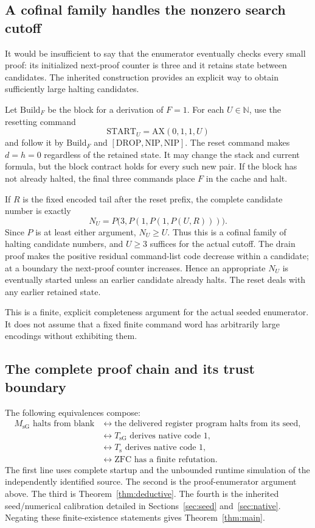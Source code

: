\subsection{A cofinal family handles the nonzero search cutoff}

It would be insufficient to say that the enumerator eventually checks
every small proof: its initialized next-proof counter is three and it
retains state between candidates. The inherited construction provides
an explicit way to obtain sufficiently large halting candidates.

Let $\mathrm{Build}_F$ be the block for a derivation of $F=1$. For each
$U\in\mathbb N$, use the resetting command
\[
 \mathrm{START}_U=\mathrm{AX}(0,1,1,U)
\]
and follow it by $\mathrm{Build}_F$ and
$[\mathrm{DROP},\mathrm{NIP},\mathrm{NIP}]$.
The reset command makes $d=h=0$ regardless of the retained state.
It may change the stack and current formula, but the block contract
holds for every such new pair. If the block has not already halted,
the final three commands place $F$ in the cache and halt.

If $R$ is the fixed encoded tail after the reset prefix, the complete
candidate number is exactly
\[
 N_U=P\bigl(3,P(1,P(1,P(U,R)))\bigr).
\]
Since $P$ is at least either argument, $N_U\geq U$. Thus this is a
cofinal family of halting candidate numbers, and $U\geq3$ suffices
for the actual cutoff. The drain proof makes the positive residual
command-list code decrease within a candidate; at a boundary the
next-proof counter increases. Hence an appropriate $N_U$ is eventually
started unless an earlier candidate already halts. The reset deals
with any earlier retained state.

This is a finite, explicit completeness argument for the actual seeded
enumerator. It does not assume that a fixed finite command word has
arbitrarily large encodings without exhibiting them.

\subsection{The complete proof chain and its trust boundary}

The following equivalences compose:
\begin{align*}
 M_{\mathrm{sG}}\text{ halts from blank}
 &\longleftrightarrow
    \text{the delivered register program halts from its seed},\\
 &\longleftrightarrow T_{\mathrm{sG}}\text{ derives native code }1,\\
 &\longleftrightarrow T_{\mathrm s}\text{ derives native code }1,\\
 &\longleftrightarrow \mathrm{ZFC}\text{ has a finite refutation}.
\end{align*}
The first line uses complete startup and the unbounded runtime
simulation of the independently identified source. The second is
the proof-enumerator argument above. The third is
Theorem~\ref{thm:deductive}. The fourth is the inherited seed/numerical
calibration detailed in Sections~\ref{sec:seed} and~\ref{sec:native}.
Negating these finite-existence statements gives
Theorem~\ref{thm:main}.

